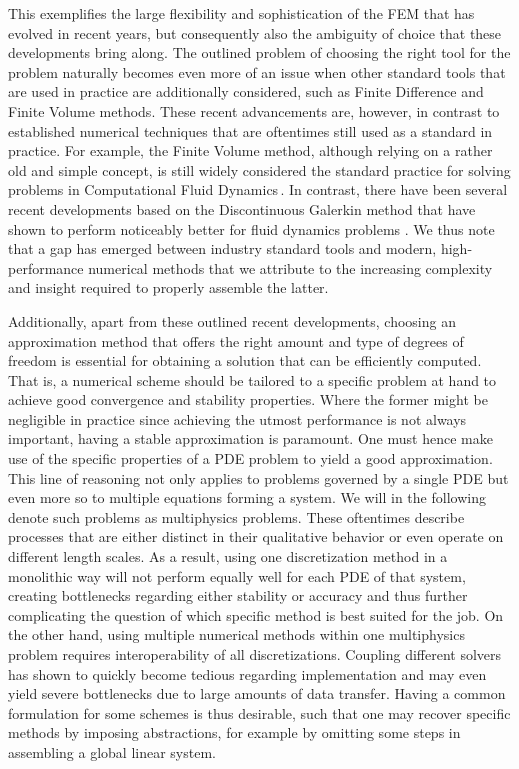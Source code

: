 \documentclass[asi,article,submit,moreauthors]{Definitions/mdpi}
\begin{document}
This exemplifies the large flexibility and sophistication of the FEM that has evolved in recent years, but consequently also the ambiguity of choice that these developments bring along.
The outlined problem of choosing the right tool for the problem naturally becomes even more of an issue when other standard tools that are used in practice are additionally considered, such as Finite Difference and Finite Volume methods.
These recent advancements are, however, in contrast to established numerical techniques that are oftentimes still used as a standard in practice.
For example, the Finite Volume method, although relying on a rather old and simple concept, is still widely considered the standard practice for solving problems in Computational Fluid Dynamics\,\cite{shademanEvaluationOpenFOAMAcademic2013}.
In contrast, there have been several recent developments based on the Discontinuous Galerkin method that have shown to perform noticeably better for fluid dynamics problems \cite{zhouNumericalComparisonWENO2001}.
We thus note that a gap has emerged between industry standard tools and modern, high-performance numerical methods that we attribute to the increasing complexity and insight required to properly assemble the latter.

Additionally, apart from these outlined recent developments, choosing an approximation method that offers the right amount and type of degrees of freedom is essential for obtaining a solution that can be efficiently computed.
That is, a numerical scheme should be tailored to a specific problem at hand to achieve good convergence and stability properties.
Where the former might be negligible in practice since achieving the utmost performance is not always important, having a stable approximation is paramount.
One must hence make use of the specific properties of a PDE problem to yield a good approximation.
This line of reasoning not only applies to problems governed by a single PDE but even more so to multiple equations forming a system.
We will in the following denote such problems as multiphysics problems.
These oftentimes describe processes that are either distinct in their qualitative behavior or even operate on different length scales.
As a result, using one discretization method in a monolithic way will not perform equally well for each PDE of that system, creating bottlenecks regarding either stability or accuracy and thus further complicating the question of which specific method is best suited for the job.
On the other hand, using multiple numerical methods within one multiphysics problem requires interoperability of all discretizations.
Coupling different solvers has shown to quickly become tedious regarding implementation and may even yield severe bottlenecks due to large amounts of data transfer.
Having a common formulation for some schemes is thus desirable, such that one may recover specific methods by imposing abstractions, for example by omitting some steps in assembling a global linear system.
\end{document}
